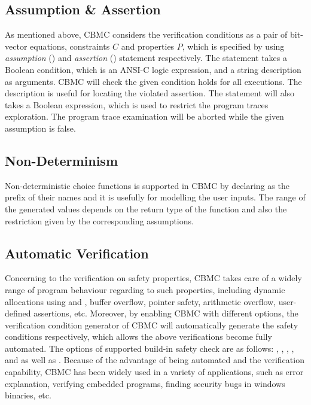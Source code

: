 \subsection{Assumption \& Assertion}
As mentioned above, CBMC considers the verification conditions as a pair of bit-vector equations, constraints $C$ and properties $P$, which is specified by using \textit{assumption} () and \textit{assertion} () statement respectively. The  statement takes a Boolean condition, which is an ANSI-C logic expression, and a string description as arguments. CBMC will check the given condition holds for all executions. The description is useful for locating the violated assertion. The  statement will also takes a Boolean expression, which is used to restrict the program traces exploration. The program trace examination will be aborted while the given assumption is false.

\subsection{Non-Determinism}
Non-deterministic choice functions is supported in CBMC by declaring  as the prefix of their names and it is usefully for modelling the user inputs. The range of the generated values depends on the return type of the function and also the restriction given by the corresponding assumptions. 

\subsection{Automatic Verification} \label{subsec:av}
Concerning to the verification on safety properties, CBMC takes care of a widely range of program behaviour regarding to such properties, including dynamic allocations using  and , buffer overflow, pointer safety, arithmetic overflow, user-defined assertions, etc. Moreover, by enabling CBMC with different options, the verification condition generator of CBMC will automatically generate the safety conditions respectively, which allows the above verifications become fully automated. The options of supported build-in safety check are as follows: , , ,  , and  as well as . Because of the advantage of being automated and the verification capability, CBMC has been widely used in a variety of applications, such as error explanation, verifying embedded programs, finding security bugs in windows binaries, etc.

